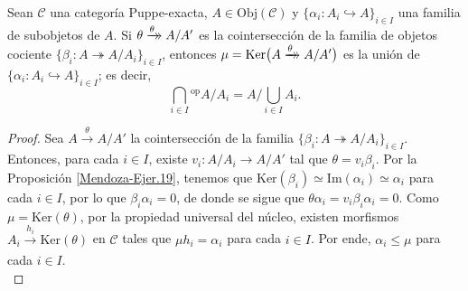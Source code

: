 \documentclass[tesis]{subfiles}
\begin{document}
\begin{Prop}\label{Mendoza-Ejer.36}
    Sean $\mathscr{C}$ una categoría Puppe-exacta, $A\in\text{Obj}(\mathscr{C})$ y $\{\alpha_i:A_i\hookrightarrow A\}_{i\in I}$ una familia de subobjetos de $A$. Si $\theta\xrightarrow[]{\theta}\mathrel{\mkern-14mu}\rightarrow A/A'$ es la cointersección de la familia de objetos cociente $\{\beta_i:A\twoheadrightarrow A/A_i\}_{i\in I}$, entonces $\mu = \text{Ker}\big(A\xrightarrow[]{\theta}\mathrel{\mkern-14mu}\rightarrow A/A'\big)$ es la unión de $\{\alpha_i:A_i\hookrightarrow A\}_{i\in I}$; es decir,
    \[
        \bigcap_{i\in I}{}^\text{op} A/A_i = A / \bigcup_{i\in I}A_i .
    \] 
\end{Prop}

\begin{proof}

    Sea $A\xrightarrow[]{\theta}A/A'$ la cointersección de la familia $\{\beta_i:A\twoheadrightarrow A/A_i\}_{i\in I}$. Entonces, para cada $i\in I$, existe $v_i:A/A_i\to A/A'$ tal que $\theta=v_i\beta_i$. Por la Proposición \ref{Mendoza-Ejer.19}, tenemos que $\text{Ker}(\beta_i)\simeq \text{Im}(\alpha_i) \simeq \alpha_i$ para cada $i\in I$, por lo que $\beta_i\alpha_i = 0$, de donde se sigue que $\theta\alpha_i = v_i\beta_i\alpha_i = 0$. Como $\mu = \text{Ker}(\theta)$, por la propiedad universal del núcleo, existen morfismos $A_i\xrightarrow[]{h_i}\text{Ker}(\theta)$ en $\mathscr{C}$ tales que $\mu h_i = \alpha_i$ para cada $i\in I$. Por ende, $\alpha_i\le\mu$ para cada $i\in I$. \\


\end{proof}
\end{document}

